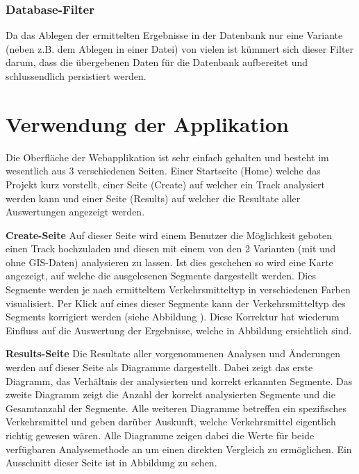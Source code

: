 
\subsubsection{Database-Filter}
Da das Ablegen der ermittelten Ergebnisse in der Datenbank  nur eine Variante (neben z.B. dem Ablegen  in einer Datei) von vielen ist kümmert sich dieser Filter darum, dass die übergebenen Daten für die Datenbank aufbereitet und schlussendlich persistiert werden.

\section{Verwendung der Applikation}
Die Oberfläche der Webapplikation ist sehr einfach gehalten und besteht im wesentlich aus 3 verschiedenen Seiten. Einer Startseite (Home) welche das Projekt kurz vorstellt, einer Seite (Create) auf welcher ein Track analysiert werden kann und einer Seite (Results) auf welcher die Resultate aller Auswertungen angezeigt werden.

\textbf{Create-Seite}
Auf dieser Seite wird einem Benutzer die Möglichkeit geboten einen Track hochzuladen und diesen mit einem von den 2 Varianten (mit und ohne GIS-Daten) analysieren zu lassen. Ist dies geschehen so wird eine Karte angezeigt, auf welche die ausgelesenen Segmente dargestellt werden. Dies Segmente werden je nach ermitteltem Verkehrsmitteltyp in verschiedenen Farben visualisiert. Per Klick auf eines dieser Segmente kann der Verkehrsmitteltyp des Segments korrigiert werden (siehe Abbildung ). Diese Korrektur hat wiederum Einfluss auf die Auswertung der Ergebnisse, welche in Abbildung  ersichtlich sind.


\textbf{Results-Seite}
Die Resultate aller vorgenommenen Analysen und Änderungen werden auf dieser Seite als Diagramme dargestellt. Dabei zeigt das erste Diagramm, das Verhältnis der analysierten und korrekt erkannten Segmente. Das zweite Diagramm zeigt die Anzahl der korrekt analysierten Segmente und die Gesamtanzahl der Segmente. Alle weiteren Diagramme betreffen ein spezifisches Verkehrsmittel und geben darüber Auskunft, welche Verkehrsmittel eigentlich richtig gewesen wären. Alle Diagramme zeigen dabei die Werte für beide verfügbaren Analysemethode an um einen direkten Vergleich zu ermöglichen. Ein Ausschnitt dieser Seite ist in Abbildung  zu sehen.

